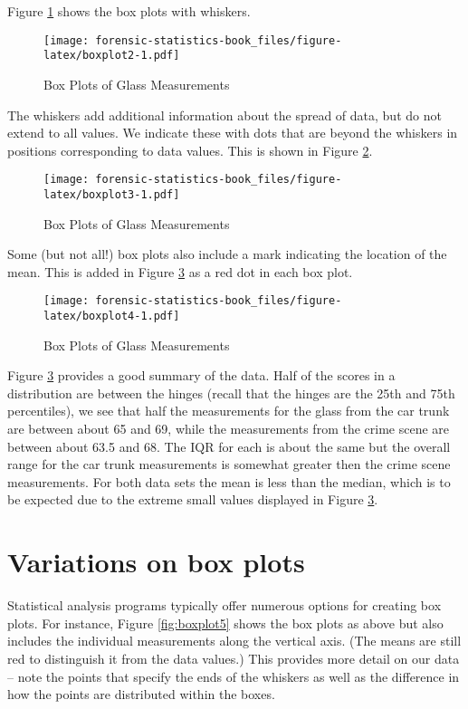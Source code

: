 \documentclass[
]{book}
\begin{document}
Figure \ref{fig:boxplot2} shows the box plots with whiskers.

\begin{figure}
\centering
\texttt{[image: forensic-statistics-book\_files/figure-latex/boxplot2-1.pdf]}
\caption{\label{fig:boxplot2}Box Plots of Glass Measurements}
\end{figure}

The whiskers add additional information about the spread of data, but do
not extend to all values. We indicate these with dots that are beyond
the whiskers in positions corresponding to data values. This is shown in
Figure \ref{fig:boxplot3}.

\begin{figure}
\centering
\texttt{[image: forensic-statistics-book\_files/figure-latex/boxplot3-1.pdf]}
\caption{\label{fig:boxplot3}Box Plots of Glass Measurements}
\end{figure}

Some (but not all!) box plots also include a mark indicating the location of
the mean. This is added in Figure \ref{fig:boxplot4} as a red dot in each
box plot.

\begin{figure}
\centering
\texttt{[image: forensic-statistics-book\_files/figure-latex/boxplot4-1.pdf]}
\caption{\label{fig:boxplot4}Box Plots of Glass Measurements}
\end{figure}

Figure \ref{fig:boxplot4} provides a good summary of the data. Half of
the scores in a distribution are between the hinges (recall that the hinges are
the 25th and 75th percentiles), we see that half the measurements for the glass
from the car trunk are between about 65 and 69, while the measurements from the
crime scene are between about 63.5 and 68. The IQR for each is about the same
but the overall range for the car trunk measurements is somewhat greater
then the crime scene measurements. For both data sets the mean is less than
the median, which is to be expected due to the extreme small values displayed
in Figure \ref{fig:boxplot4}.

\hypertarget{variations-on-box-plots}{%
\section{Variations on box plots}\label{variations-on-box-plots}}

Statistical analysis programs typically offer numerous options for creating
box plots. For instance, Figure \ref{fig:boxplot5} shows the box plots
as above but also includes the individual measurements along the vertical
axis. (The means are still red to distinguish it from the data values.)
This provides more detail on our data -- note the points that specify
the ends of the whiskers as well as the difference in how the points are
distributed within the boxes.
\end{document}
